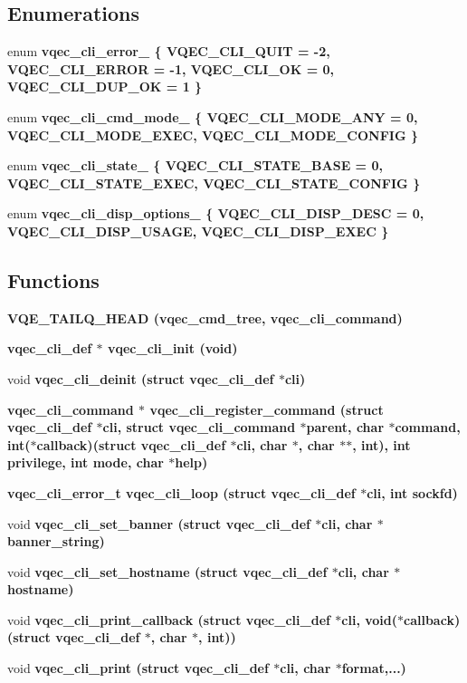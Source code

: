 \subsection*{Enumerations}
\begin{CompactItemize}
\item 
enum \bf{vqec\_\-cli\_\-error\_\-} \{ \bf{VQEC\_\-CLI\_\-QUIT} =  -2, 
\bf{VQEC\_\-CLI\_\-ERROR} =  -1, 
\bf{VQEC\_\-CLI\_\-OK} =  0, 
\bf{VQEC\_\-CLI\_\-DUP\_\-OK} =  1
 \}
\item 
enum \bf{vqec\_\-cli\_\-cmd\_\-mode\_\-} \{ \bf{VQEC\_\-CLI\_\-MODE\_\-ANY} =  0, 
\bf{VQEC\_\-CLI\_\-MODE\_\-EXEC}, 
\bf{VQEC\_\-CLI\_\-MODE\_\-CONFIG}
 \}
\item 
enum \bf{vqec\_\-cli\_\-state\_\-} \{ \bf{VQEC\_\-CLI\_\-STATE\_\-BASE} =  0, 
\bf{VQEC\_\-CLI\_\-STATE\_\-EXEC}, 
\bf{VQEC\_\-CLI\_\-STATE\_\-CONFIG}
 \}
\item 
enum \bf{vqec\_\-cli\_\-disp\_\-options\_\-} \{ \bf{VQEC\_\-CLI\_\-DISP\_\-DESC} =  0, 
\bf{VQEC\_\-CLI\_\-DISP\_\-USAGE}, 
\bf{VQEC\_\-CLI\_\-DISP\_\-EXEC}
 \}
\end{CompactItemize}
\subsection*{Functions}
\begin{CompactItemize}
\item 
\bf{VQE\_\-TAILQ\_\-HEAD} (vqec\_\-cmd\_\-tree, \bf{vqec\_\-cli\_\-command})
\item 
\bf{vqec\_\-cli\_\-def} $\ast$ \bf{vqec\_\-cli\_\-init} (void)
\item 
void \bf{vqec\_\-cli\_\-deinit} (struct \bf{vqec\_\-cli\_\-def} $\ast$cli)
\item 
\bf{vqec\_\-cli\_\-command} $\ast$ \bf{vqec\_\-cli\_\-register\_\-command} (struct \bf{vqec\_\-cli\_\-def} $\ast$cli, struct \bf{vqec\_\-cli\_\-command} $\ast$parent, char $\ast$command, int($\ast$callback)(struct \bf{vqec\_\-cli\_\-def} $\ast$cli, char $\ast$, char $\ast$$\ast$, int), int privilege, int mode, char $\ast$help)
\item 
\bf{vqec\_\-cli\_\-error\_\-t} \bf{vqec\_\-cli\_\-loop} (struct \bf{vqec\_\-cli\_\-def} $\ast$cli, int sockfd)
\item 
void \bf{vqec\_\-cli\_\-set\_\-banner} (struct \bf{vqec\_\-cli\_\-def} $\ast$cli, char $\ast$banner\_\-string)
\item 
void \bf{vqec\_\-cli\_\-set\_\-hostname} (struct \bf{vqec\_\-cli\_\-def} $\ast$cli, char $\ast$hostname)
\item 
void \bf{vqec\_\-cli\_\-print\_\-callback} (struct \bf{vqec\_\-cli\_\-def} $\ast$cli, void($\ast$callback)(struct \bf{vqec\_\-cli\_\-def} $\ast$, char $\ast$, int))
\item 
void \bf{vqec\_\-cli\_\-print} (struct \bf{vqec\_\-cli\_\-def} $\ast$cli, char $\ast$format,...)
\end{CompactItemize}


